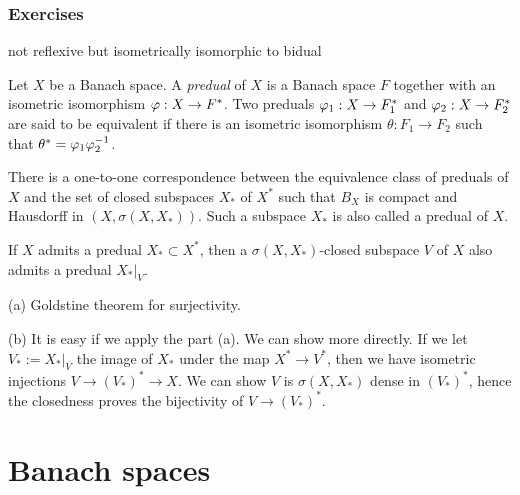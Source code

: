 \documentclass{../../large}
\begin{document}
\section*{Exercises}
\begin{prb}
not reflexive but isometrically isomorphic to bidual
\end{prb}

\begin{prb}[Preduals]
Let $X$ be a Banach space.
A \emph{predual} of $X$ is a Banach space $F$ together with an isometric isomorphism $\varphi:X\to F^*$.
Two preduals $\varphi_1:X\to F_1^*$ and $\varphi_2:X\to F_2^*$ are said to be equivalent if there is an isometric isomorphism $\theta:F_1\to F_2$ such that $\theta^*=\varphi_1\varphi_2^{-1}$.
\begin{parts}
\item There is a one-to-one correspondence between the equivalence class of preduals of $X$ and the set of closed subspaces $X_*$ of $X^*$ such that $B_X$ is compact and Hausdorff in $(X,\sigma(X,X_*))$.
Such a subspace $X_*$ is also called a predual of $X$.
\item If $X$ admits a predual $X_*\subset X^*$, then a $\sigma(X,X_*)$-closed subspace $V$ of $X$ also admits a predual $X_*|_V$.
\end{parts}
\end{prb}
\begin{pf}
(a) Goldstine theorem for surjectivity.

(b)
It is easy if we apply the part (a).
We can show more directly.
If we let $V_*:=X_*|_V$ the image of $X_*$ under the map $X^*\to V^*$, then we have isometric injections $V\to(V_*)^*\to X$.
We can show $V$ is $\sigma(X,X_*)$ dense in $(V_*)^*$, hence the closedness proves the bijectivity of $V\to(V_*)^*$.
\end{pf}

\begin{prb}

\end{prb}



















\part{Banach spaces}
\end{document}
